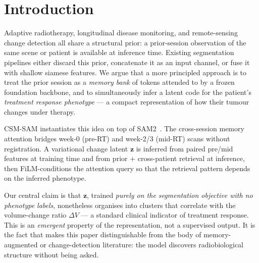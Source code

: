 \section{Introduction}
\label{sec:intro}

Adaptive radiotherapy, longitudinal disease monitoring, and remote-sensing
change detection all share a structural prior: a prior-session observation
of the same scene or patient is available at inference time.  Existing
segmentation pipelines either discard this prior, concatenate it as an
input channel, or fuse it with shallow siamese features.  We argue that a
more principled approach is to treat the prior session as a \emph{memory bank}
of tokens attended to by a frozen foundation backbone, and to simultaneously
infer a latent code for the patient's \emph{treatment response phenotype} —
a compact representation of how their tumour changes under therapy.

CSM-SAM instantiates this idea on top of SAM2~\cite{ravi2024sam2}.
The cross-session memory attention bridges week-0 (pre-RT) and week-2/3
(mid-RT) scans without registration.  A variational change latent
$\mathbf{z}$ is inferred from paired pre/mid features at training time and
from prior + cross-patient retrieval at inference, then FiLM-conditions the
attention query so that the retrieval pattern depends on the inferred phenotype.

Our central claim is that $\mathbf{z}$, trained \emph{purely on the
segmentation objective with no phenotype labels}, nonetheless
organises into clusters that correlate with the volume-change ratio $\Delta V$
— a standard clinical indicator of treatment response.  This is an
\emph{emergent} property of the representation, not a supervised output.
It is the fact that makes this paper distinguishable from the body of
memory-augmented or change-detection literature: the model discovers
radiobiological structure without being asked.

